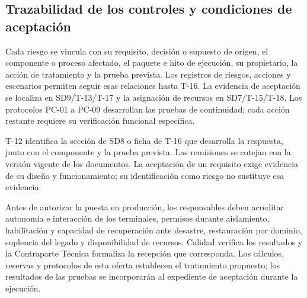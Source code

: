 \subsection{Trazabilidad de los controles y condiciones de aceptación}\label{sec:sd8-trazabilidad-p08}
Cada riesgo se vincula con su requisito, decisión o supuesto de origen, el componente o proceso afectado, el paquete e hito de ejecución, su propietario, la acción de tratamiento y la prueba prevista. Los registros de riesgos, acciones y escenarios permiten seguir esas relaciones hasta T-16. La evidencia de aceptación se localiza en SD9/T-13/T-17 y la asignación de recursos en SD7/T-15/T-18. Los protocolos PC-01 a PC-09 desarrollan las pruebas de continuidad; cada acción restante requiere su verificación funcional específica.

T-12 identifica la sección de SD8 o ficha de T-16 que desarrolla la respuesta, junto con el componente y la prueba prevista. Las remisiones se cotejan con la versión vigente de los documentos. La aceptación de un requisito exige evidencia de su diseño y funcionamiento; su identificación como riesgo no sustituye esa evidencia. \parencites[numeral~1.5, p.~4]{sd8-bt}[arts.~46--47, p.~28]{sd8-ba}

Antes de autorizar la puesta en producción, los responsables deben acreditar autonomía e interacción de los terminales, permisos durante aislamiento, habilitación y capacidad de recuperación ante desastre, restauración por dominio, suplencia del legado y disponibilidad de recursos. Calidad verifica los resultados y la Contraparte Técnica formaliza la recepción que corresponda. Los cálculos, reservas y protocolos de esta oferta establecen el tratamiento propuesto; los resultados de las pruebas se incorporarán al expediente de aceptación durante la ejecución.

